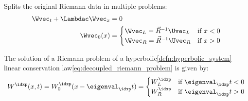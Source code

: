 \begin{defnbox}\nospacing
    \begin{defn}\label{defn:decoupled_riemann_problem}
        Splits the original Riemann data in multiple problems:
        \begin{align}
          \Wvec_{t}+\Lambdac\Wvec_{x}&=0\nonumber\\
          \Wvec_{0}(x)&=\begin{cases}\Wvec_{L}=\vec{R}^{-1}\Uvec_{L}&\text{if }x<0\\
                \Wvec_{R}=\vec{R}^{-1}\Uvec_{R}&\text{if }x>0
              \end{cases}\label{eq:decoupled_riemann_problem}
        \end{align}
        \begin{figure}[H]
            \vspace{-2em}
            \centering{
              \def\svgwidth{150pt}
              \resizebox{0.7\linewidth}{!}{}
            }
        \end{figure}
    \end{defn}
\end{defnbox}
\begin{corbox}\nospacing
    \begin{cor}\label{cor:riemann_hyper_lin_cons_law}
        The solution of a Riemann problem of a hyperbolic\cref{defn:hyperbolic_system} linear conservation law\cref{eq:decoupled_riemann_problem} is given by:
        \begin{align}
          W^{\idxp}(x,t)=W_{0}^{\idxp}(x-\eigenval_{\idxp}t)=
          \begin{cases}
              W_{L}^{\idxp}&\text{if }\eigenval_{\idxp}t<0\\
              W_{R}^{\idxp}&\text{if }\eigenval_{\idxp}t>0
          \end{cases}
        \end{align}
    \end{cor}
\end{corbox}
